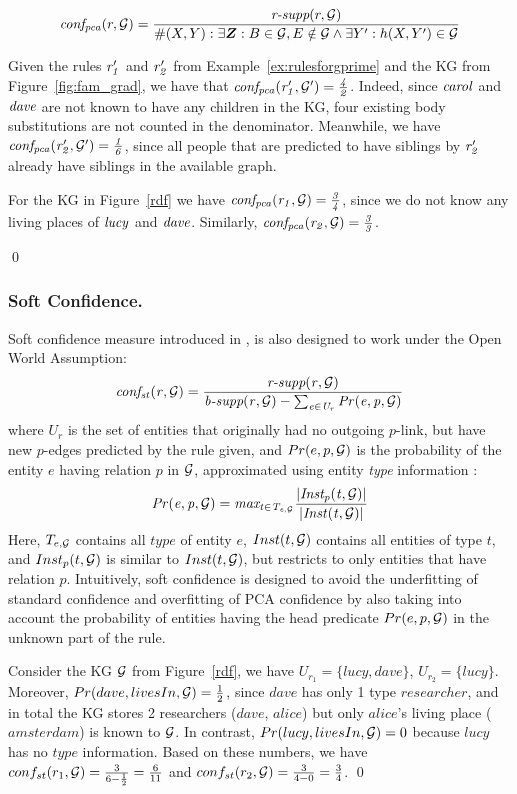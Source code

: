 \[
\mi{conf_{pca}}(r, \cG) = \frac{\textit{r-supp}(r, \cG)}{\#(X,Y): \exists \vec{Z}: B \in \cG, E \notin \cG  \wedge \exists Y': h(X,Y')\in \cG}
\]
\begin{example}
Given the rules $\mathit{r_1'}$ and $\mathit{r_2'}$ from Example~\ref{ex:rulesforgprime} and the KG from Figure~\ref{fig:fam_grad}, we have that $\mathit{conf_{pca}(r_1',\mathcal{G}') = \frac{4}{2}}$. Indeed, since $\mathit{carol}$ and $\mathit{dave}$ are not known
to have any children in the KG, four existing body substitutions are not counted in the
denominator. Meanwhile, we have $\mathit{conf_{pca}(r_2', \mathcal{G}') = \frac{1}{6}}$, since all people that are predicted to have siblings by $\mathit{r_2'}$ already have siblings in the available graph.

For the KG in Figure~\ref{rdf} we have $\mathit{conf_{pca}(r_1,\mathcal{G}) = \frac{3}{4}}$, since we do not know any living places of $\mathit{lucy}$ and $\mathit{dave}$. Similarly, $\mathit{conf_{pca}(r_2,\mathcal{G}) = \frac{3}{3}}$.

\qed
\end{example}

\subsubsection{Soft Confidence.} Soft confidence measure introduced in \cite{rdf2rules}, is also designed to work under the Open World Assumption:
\[\mathit{conf_{st}(r, \mathcal{G}) = \frac{\textit{r-supp}(r, \mathcal{G})}{\textit{b-supp}(r,\mathcal{G}) - \sum_{e \in U_r}Pr(e,p,\mathcal{G})}} \]
where $U_r$ is the set of entities that %
originally had no outgoing %
$p$-link, but have new $p$-edges predicted by the rule given, and $Pr(e,p,\mathcal{G})$ is the probability of the entity $e$ having relation $p$ in $\mathcal{G}$, approximated using entity \textit{type} information \cite{rdf2rules}:
\[\mathit{Pr(e,p,\mathcal{G})  = max_{t \in T_{e,\mathcal{G}}}\frac{|Inst_p(t, \mathcal{G})|}{|Inst(t, \mathcal{G})|}{}}\]
Here, $T_{e,\mathcal{G}}$ contains all $type$ of entity $e$, $Inst(t, \mathcal{G})$ contains all entities of type $t$, and $Inst_p(t, \mathcal{G})$ is similar to $Inst(t, \mathcal{G})$, but restricts to only entities that have relation $p$.
Intuitively, soft confidence is designed to avoid the underfitting of standard confidence and overfitting of PCA confidence by also taking into account the probability of entities having the head predicate $Pr(e,p, \mathcal{G})$ in the unknown part of the rule.
\begin{example}
Consider the KG $\mathcal{G}$ from Figure~\ref{rdf}, we have $U_{r_1} = \{lucy, dave\}$, $U_{r_2} = \{lucy\}$. Moreover, $Pr(dave,livesIn,\mathcal{G}) = \frac{1}{2}$, since $dave$ has only 1 type $researcher$, and in total the KG stores 
2 researchers ($dave$, $alice$) but only $alice$'s living place ($amsterdam$) is known to $\mathcal{G}$. In contrast, $Pr(lucy,livesIn,\mathcal{G}) = 0$ because $lucy$ has no $type$ information.
Based on these numbers, we have $conf_{st}(r_1,\mathcal{G}) = \frac{3}{6-\frac{1}{2}} = \frac{6}{11}$ and $conf_{st}(r_2,\mathcal{G}) = \frac{3}{4-0} = \frac{3}{4}$.
\qed
\end{example}
